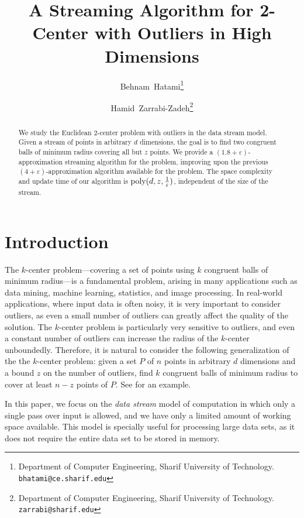 \documentclass[envcountsame]{cls/cccg15}
\title{A Streaming Algorithm for 2-Center with Outliers in High Dimensions}
\author{Behnam~Hatami\thanks{Department of Computer Engineering, 
	Sharif University of Technology.
	{\tt bhatami@ce.sharif.edu}}
	\and 
	Hamid~Zarrabi-Zadeh\thanks{Department of Computer Engineering, 
	Sharif University of Technology.
	{\tt zarrabi@sharif.edu}}
}
\newcommand{\poly}{\mathop{\mathrm{poly}}}
\newcommand{\eps}{\varepsilon}
\begin{document}
\maketitle
\pagestyle{plain}


\begin{abstract}
We study the Euclidean 2-center problem with outliers in the data stream model. 
Given a stream of points in arbitrary $d$ dimensions, the goal is to find two congruent balls 
of minimum radius covering all but $z$ points. 
We provide a $(1.8+\eps)$-approximation streaming algorithm for the problem, 
improving upon the previous $(4 + \eps)$-approximation algorithm available for the problem.
The space complexity and update time of our algorithm is $\poly(d, z, {1 \over \eps})$,
independent of the size of the stream.
\end{abstract}


\section{Introduction}
The $k$-center problem---covering a set of points 
using $k$ congruent balls of minimum radius---is a fundamental problem,
arising in many applications 
such as data mining, machine learning, statistics, and image processing.
In real-world applications, where input data is often noisy, 
it is very important to consider outliers, 
as even a small number of outliers can greatly affect the quality of the solution.
The $k$-center problem is particularly very sensitive to outliers,
and even a constant number of outliers can increase the radius of the $k$-center unboundedly.
Therefore, it is natural to consider the following generalization of
the the $k$-center problem: %
given a set $P$ of $n$ points in arbitrary $d$ dimensions
and a bound $z$ on the number of outliers,
find $k$ congruent balls of minimum radius 
to cover at least $n - z$ points of $P$.
See  for an example.

In this paper, we focus on the \emph{data stream} model of computation
in which only a single pass over input is allowed,
and we have only a limited amount of working space available.
This model is specially useful for processing large data sets,
as it does not require the entire data set to be stored in memory.
\end{document}
